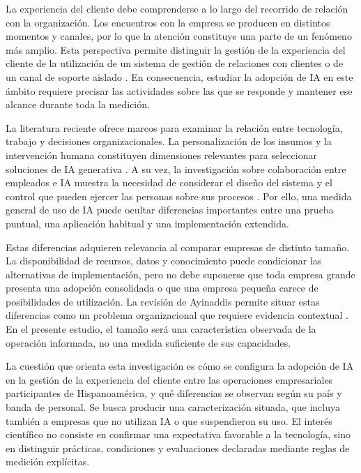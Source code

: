 \documentclass[12pt,letterpaper]{article}
\begin{document}
La experiencia del cliente debe comprenderse a lo largo del recorrido de relación con la organización. Los encuentros con la empresa se producen en distintos momentos y canales, por lo que la atención constituye una parte de un fenómeno más amplio. Esta perspectiva permite distinguir la gestión de la experiencia del cliente de la utilización de un sistema de gestión de relaciones con clientes o de un canal de soporte aislado \citep{lemon}. En consecuencia, estudiar la adopción de IA en este ámbito requiere precisar las actividades sobre las que se responde y mantener ese alcance durante toda la medición.

La literatura reciente ofrece marcos para examinar la relación entre tecnología, trabajo y decisiones organizacionales. La personalización de los insumos y la intervención humana constituyen dimensiones relevantes para seleccionar soluciones de IA generativa \citep{grewal}. A su vez, la investigación sobre colaboración entre empleados e IA muestra la necesidad de considerar el diseño del sistema y el control que pueden ejercer las personas sobre sus procesos \citep{blaurock}. Por ello, una medida general de uso de IA puede ocultar diferencias importantes entre una prueba puntual, una aplicación habitual y una implementación extendida.

Estas diferencias adquieren relevancia al comparar empresas de distinto tamaño. La disponibilidad de recursos, datos y conocimiento puede condicionar las alternativas de implementación, pero no debe suponerse que toda empresa grande presenta una adopción consolidada o que una empresa pequeña carece de posibilidades de utilización. La revisión de Ayinaddis permite situar estas diferencias como un problema organizacional que requiere evidencia contextual \citep{ayinaddis}. En el presente estudio, el tamaño será una característica observada de la operación informada, no una medida suficiente de sus capacidades.

La cuestión que orienta esta investigación es cómo se configura la adopción de IA en la gestión de la experiencia del cliente entre las operaciones empresariales participantes de Hispanoamérica, y qué diferencias se observan según su país y banda de personal. Se busca producir una caracterización situada, que incluya también a empresas que no utilizan IA o que suspendieron su uso. El interés científico no consiste en confirmar una expectativa favorable a la tecnología, sino en distinguir prácticas, condiciones y evaluaciones declaradas mediante reglas de medición explícitas.
\end{document}
